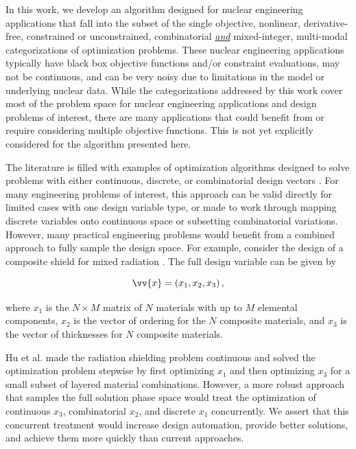 \documentclass{article}                                                                           %
\begin{document}
In this work, we develop an algorithm designed for nuclear engineering applications that fall into the subset of the single objective, nonlinear, derivative-free, constrained or unconstrained, combinatorial  \underline{\textit{and}} mixed-integer, multi-modal categorizations of optimization problems. 
These nuclear engineering applications typically have black box objective functions and/or constraint evaluations, may not be continuous, and can be very noisy due to limitations in the model or underlying nuclear data.
While the categorizations addressed by this work cover most of the problem space for nuclear engineering applications and design problems of interest, there are many applications that could benefit from or require considering multiple objective functions.
This is not yet explicitly considered for the algorithm presented here.

The literature is filled with examples of optimization algorithms designed to solve problems with either continuous, discrete, or combinatorial design vectors \cite{Lee2011, Storn1997, Marichelvam2014, Yang2009, Ouaarab2014, Yang2014, Hou2016}.  
For many engineering problems of interest, this approach can be valid directly for limited cases with one design variable type, or made to work through mapping discrete variables onto continuous space or subsetting combinatorial variations.
However, many practical engineering problems would benefit from a combined approach to fully sample the design space.  
For example, consider the design of a composite shield for mixed radiation \cite{Hu2008}.  
The full design variable can be given by

\begin{equation}
  \vv{x}=\left(x_1, x_2, x_3 \right),
\end{equation}

\noindent where $x_1$ is the $N \times M$ matrix of $N$ materials with up to $M$ elemental components, $x_2$ is the vector of ordering for the $N$ composite materials, and $x_3$ is the vector of thicknesses for $N$ composite materials.  

Hu et al. \cite{Hu2008} made the radiation shielding problem continuous and solved the optimization problem stepwise by first optimizing $x_1$ and then optimizing $x_3$ for a small subset of layered material combinations.  
However, a more robust approach that samples the full solution phase space would treat the optimization of continuous $x_3$, combinatorial $x_2$, and discrete $x_1$ concurrently. 
We assert that this concurrent treatment would increase design automation, provide better solutions, and achieve them more quickly than current approaches. 
\end{document}

